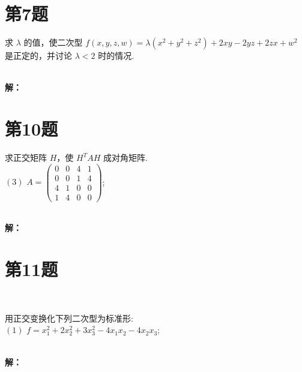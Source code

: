 \documentclass[a4paper, 12pt]{ctexart}
\begin{document}
\section{第7题}
\begin{exercise}
求 $\lambda$ 的值，使二次型 $f(x,y,z,w) = \lambda(x^2 + y^2 + z^2) + 2xy - 2yz + 2zx + w^2$ 是正定的，并讨论 $\lambda < 2$ 时的情况.
\end{exercise}~\\
\noindent\textbf{解：}\\

\section{第10题}
\begin{exercise}
求正交矩阵 \( H \)，使 \( H^T AH \) 成对角矩阵.~\\

$(3)$ \( A = \begin{pmatrix} 0 & 0 & 4 & 1 \\ 0 & 0 & 1 & 4 \\ 4 & 1 & 0 & 0 \\ 1 & 4 & 0 & 0 \end{pmatrix} \);

\end{exercise}~\\
\noindent\textbf{解：}\\

 

\section{第11题}~\\
\begin{exercise}
用正交变换化下列二次型为标准形:~\\

$(1)$ \( f = x_1^2 + 2x_2^2 + 3x_3^2 - 4x_1x_2 - 4x_2x_3 \);

\end{exercise}~\\

\noindent\textbf{解：}
\end{document}
